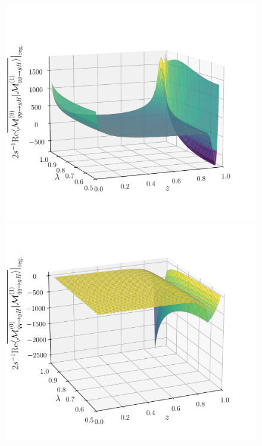 \begin{figure}[h]
  \begin{minipage}[t]{0.49\textwidth}
  \centering
  \includegraphics[width=\textwidth]{Images/RV_amplitudes/tOStOS_gg.pdf}
  \end{minipage}
  \begin{minipage}[t]{0.49\textwidth}
  \centering
  \includegraphics[width=\textwidth]{Images/RV_amplitudes/tOStOS_qBq.pdf}

\end{minipage}
\end{figure}
